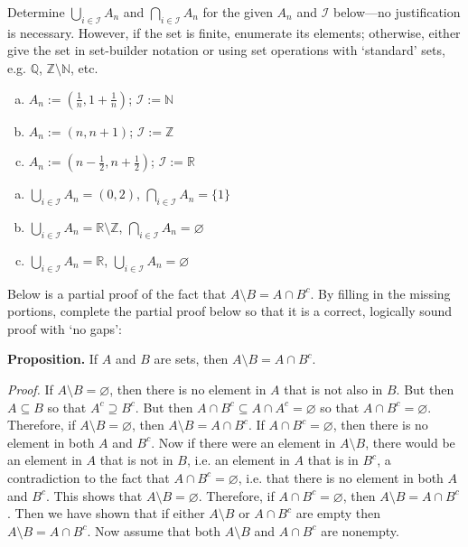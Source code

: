 \documentclass[11pt,letterpaper]{article}
\begin{document}
\newpage



 Determine $\displaystyle \bigcup_{i \in \mathcal{I}} A_n$ and $\displaystyle \bigcap_{i \in \mathcal{I}} A_n$ for the given $A_n$ and $\mathcal{I}$ below---no justification is necessary. However, if the set is finite, enumerate its elements; otherwise, either give the set in set-builder notation or using set operations with `standard' sets, e.g. $\mathbb{Q}$, $\mathbb{Z} \setminus \mathbb{N}$, etc. 
	\begin{enumerate}[(a)]
	\item $A_n:= \left( \frac{1}{n}, 1 + \frac{1}{n} \right)$; $\mathcal{I}:= \mathbb{N}$
	\item $A_n:= \left( n, n + 1 \right)$; $\mathcal{I}:= \mathbb{Z}$
	\item $A_n:= \left( n - \frac{1}{2}, n + \frac{1}{2} \right)$; $\mathcal{I}:= \mathbb{R}$
	\end{enumerate} \pspace

\sol
\begin{enumerate}[(a)]
\item $\displaystyle \bigcup_{i \in \mathcal{I}} A_n= (0, 2)$, \quad $\displaystyle \bigcap_{i \in \mathcal{I}} A_n= \{ 1 \}$

\item $\displaystyle \bigcup_{i \in \mathcal{I}} A_n= \mathbb{R} \setminus \mathbb{Z}$, \quad $\displaystyle \bigcap_{i \in \mathcal{I}} A_n= \varnothing$

\item $\displaystyle \bigcup_{i \in \mathcal{I}} A_n= \mathbb{R}$, \quad $\displaystyle \bigcup_{i \in \mathcal{I}} A_n= \varnothing$
\end{enumerate}



\newpage



 Below is a partial proof of the fact that $A \setminus B= A \cap B^c$. By filling in the missing portions, complete the partial proof below so that it is a correct, logically sound proof with `no gaps': \pspace

{\bfseries Proposition.} If $A$ and $B$ are sets, then $A \setminus B= A \cap B^c$. \pspace

{\itshape Proof.} If $A \setminus B= \varnothing$, then there is no element in $A$ that is not also in $B$. But then $A \subseteq B$ so that $A^c \supseteq B^c$. But then $A \cap B^c \subseteq A \cap A^c= \varnothing$ so that $A \cap B^c= \varnothing$. Therefore, if $A \setminus B= \varnothing$, then $A \setminus B= A \cap B^c$. If $A \cap B^c= \varnothing$, then there is no element in both $A$ and $B^c$. Now if there were an element in $A \setminus B$, there would be an element in $A$ that is not in $B$, i.e. an element in $A$ that is in $B^c$, a contradiction to the fact that $A \cap B^c= \varnothing$, i.e. that there is no element in both $A$ and $B^c$. This shows that $A \setminus B= \varnothing$. Therefore, if $A \cap B^c= \varnothing$, then $A \setminus B= A \cap B^c$. Then we have shown that if either $A \setminus B$ or $A \cap B^c$ are empty then $A \setminus B= A \cap B^c$. Now assume that both $A \setminus B$ and $A \cap B^c$ are nonempty. \pspace
\end{document}
